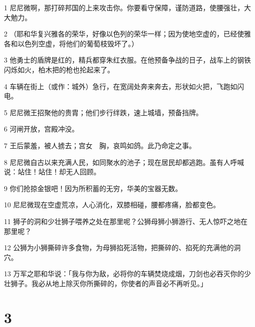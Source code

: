 \par 1 尼尼微啊，那打碎邦国的上来攻击你。你要看守保障，谨防道路，使腰强壮，大大勉力。
\par 2 （耶和华复兴雅各的荣华，好像以色列的荣华一样；因为使地空虚的，已经使雅各和以色列空虚，将他们的葡萄枝毁坏了。）
\par 3 他勇士的盾牌是红的，精兵都穿朱红衣服。在他预备争战的日子，战车上的钢铁闪烁如火，柏木把的枪也抡起来了。
\par 4 车辆在街上（或作：城外）急行，在宽阔处奔来奔去，形状如火把，飞跑如闪电。
\par 5 尼尼微王招聚他的贵胄；他们步行绊跌，速上城墙，预备挡牌。
\par 6 河闸开放，宫殿冲没。
\par 7 王后蒙羞，被人掳去；宫女　胸，哀鸣如鸽。此乃命定之事。
\par 8 尼尼微自古以来充满人民，如同聚水的池子；现在居民却都逃跑。虽有人呼喊说：站住！站住！却无人回顾。
\par 9 你们抢掠金银吧！因为所积蓄的无穷，华美的宝器无数。
\par 10 尼尼微现在空虚荒凉，人心消化，双膝相碰，腰都疼痛，脸都变色。
\par 11 狮子的洞和少壮狮子喂养之处在那里呢？公狮母狮小狮游行、无人惊吓之地在那里呢？
\par 12 公狮为小狮撕碎许多食物，为母狮掐死活物，把撕碎的、掐死的充满他的洞穴。
\par 13 万军之耶和华说：「我与你为敌，必将你的车辆焚烧成烟，刀剑也必吞灭你的少壮狮子。我必从地上除灭你所撕碎的，你使者的声音必不再听见。」

\chapter{3}


